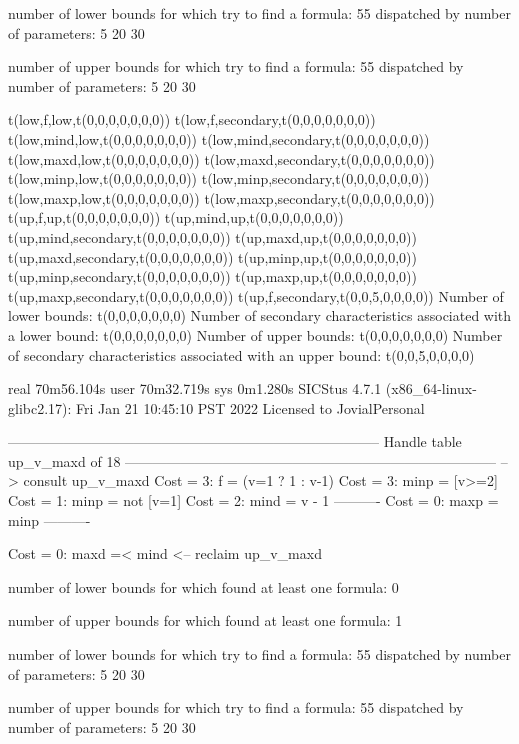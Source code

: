 number of lower bounds for which try to find a formula: 55
dispatched by number of parameters: 5  20  30

number of upper bounds for which try to find a formula: 55
dispatched by number of parameters: 5  20  30

t(low,f,low,t(0,0,0,0,0,0,0))
t(low,f,secondary,t(0,0,0,0,0,0,0))
t(low,mind,low,t(0,0,0,0,0,0,0))
t(low,mind,secondary,t(0,0,0,0,0,0,0))
t(low,maxd,low,t(0,0,0,0,0,0,0))
t(low,maxd,secondary,t(0,0,0,0,0,0,0))
t(low,minp,low,t(0,0,0,0,0,0,0))
t(low,minp,secondary,t(0,0,0,0,0,0,0))
t(low,maxp,low,t(0,0,0,0,0,0,0))
t(low,maxp,secondary,t(0,0,0,0,0,0,0))
t(up,f,up,t(0,0,0,0,0,0,0))
t(up,mind,up,t(0,0,0,0,0,0,0))
t(up,mind,secondary,t(0,0,0,0,0,0,0))
t(up,maxd,up,t(0,0,0,0,0,0,0))
t(up,maxd,secondary,t(0,0,0,0,0,0,0))
t(up,minp,up,t(0,0,0,0,0,0,0))
t(up,minp,secondary,t(0,0,0,0,0,0,0))
t(up,maxp,up,t(0,0,0,0,0,0,0))
t(up,maxp,secondary,t(0,0,0,0,0,0,0))
t(up,f,secondary,t(0,0,5,0,0,0,0))
Number of lower bounds:                                             t(0,0,0,0,0,0,0)
Number of secondary characteristics associated with a lower bound:  t(0,0,0,0,0,0,0)
Number of upper bounds:                                             t(0,0,0,0,0,0,0)
Number of secondary characteristics associated with an upper bound: t(0,0,5,0,0,0,0)

real	70m56.104s
user	70m32.719s
sys	0m1.280s
SICStus 4.7.1 (x86_64-linux-glibc2.17): Fri Jan 21 10:45:10 PST 2022
Licensed to JovialPersonal


--------------------------------------------------------------------------------
Handle table up_v_maxd of 18
--------------------------------------------------------------------------------
--> consult up_v_maxd
Cost =  3:  f    = (v=1 ? 1 : v-1)
Cost =  3:  minp = [v>=2]
Cost =  1:  minp = not [v=1]
Cost =  2:  mind = v - 1
----------
Cost =  0:  maxp = minp
----------

Cost =  0:  maxd =< mind
<-- reclaim up_v_maxd

number of lower bounds for which found at least one formula: 0

number of upper bounds for which found at least one formula: 1

number of lower bounds for which try to find a formula: 55
dispatched by number of parameters: 5  20  30

number of upper bounds for which try to find a formula: 55
dispatched by number of parameters: 5  20  30

